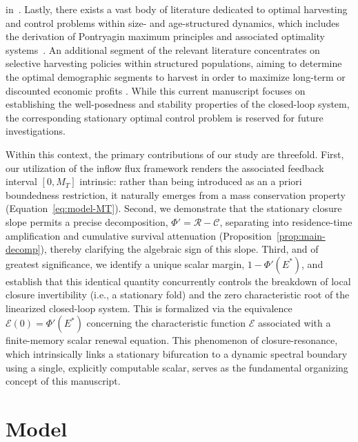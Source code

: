 \documentclass[pdflatex,sn-mathphys-num]{sn-jnl}
\theoremstyle{thmstyleone}
\theoremstyle{definition}
\theoremstyle{remark}
\newcommand{\Ev}{\mathcal{E}}
\newcommand{\Rcal}{\mathcal{R}}
\newcommand{\Ccal}{\mathcal{C}}
\numberwithin{equation}{section}
\begin{document}
in~\cite{ambrosio2000functions,gao2022rolling}. Lastly, there exists a vast body of literature dedicated to optimal harvesting and control problems within size- and age-structured dynamics, which includes the derivation of Pontryagin maximum principles and associated optimality systems~\cite{anita2013analysis,brokate1985pontryagin,feichtinger2003optimality,cai2026optimal,filho2025mathematical,kato2024measure,kumar2023stability,ni2023optimal,wu2025age,wu2025analysis}. An additional segment of the relevant literature concentrates on selective harvesting policies within structured populations, aiming to determine the optimal demographic segments to harvest in order to maximize long-term or discounted economic profits \citep{easterling2000size,fadlovich2025selectivity,stubberud2019effects,liang2026separation}. While this current manuscript focuses on establishing the well-posedness and stability properties of the closed-loop system, the corresponding stationary optimal control problem is reserved for future investigations.

Within this context, the primary contributions of our study are threefold. First, our utilization of the inflow flux framework renders the associated feedback interval $[0,M_T]$ intrinsic: rather than being introduced as an a priori boundedness restriction, it naturally emerges from a mass conservation property (Equation~\ref{eq:model-MT}). Second, we demonstrate that the stationary closure slope permits a precise decomposition, $\Phi'=\Rcal-\Ccal$, separating into residence-time amplification and cumulative survival attenuation (Proposition~\ref{prop:main-decomp}), thereby clarifying the algebraic sign of this slope. Third, and of greatest significance, we identify a unique scalar margin, $1-\Phi'(E^*)$, and establish that this identical quantity concurrently controls the breakdown of local closure invertibility (i.e., a stationary fold) and the zero characteristic root of the linearized closed-loop system. This is formalized via the equivalence $\Ev(0)=\Phi'(E^*)$ concerning the characteristic function $\Ev$ associated with a finite-memory scalar renewal equation. This phenomenon of closure-resonance, which intrinsically links a stationary bifurcation to a dynamic spectral boundary using a single, explicitly computable scalar, serves as the fundamental organizing concept of this manuscript.
\section{Model}
\label{sec:model}
\end{document}
